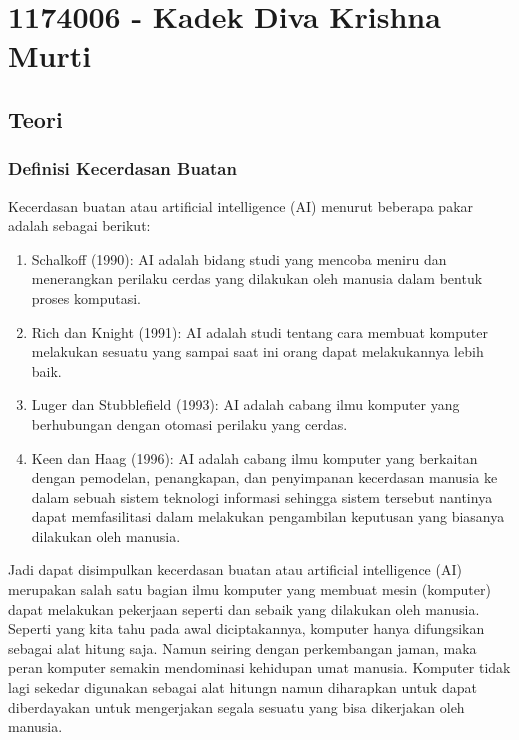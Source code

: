 \section{1174006 - Kadek Diva Krishna Murti}

\subsection{Teori}
\subsubsection{Definisi Kecerdasan Buatan}
\hfill\break
Kecerdasan buatan atau artificial intelligence (AI) menurut beberapa pakar adalah sebagai berikut:
\begin{enumerate}
	\item Schalkoff (1990): AI adalah bidang studi yang mencoba meniru dan menerangkan perilaku cerdas yang dilakukan oleh manusia dalam bentuk proses komputasi.
	\item Rich dan Knight (1991): AI adalah studi tentang cara membuat komputer melakukan sesuatu yang sampai saat ini orang dapat melakukannya lebih baik.
	\item Luger dan Stubblefield (1993): AI adalah cabang ilmu komputer yang berhubungan dengan otomasi perilaku yang cerdas.
	\item Keen dan Haag (1996): AI adalah cabang ilmu komputer yang berkaitan dengan pemodelan, penangkapan, dan penyimpanan kecerdasan manusia ke dalam sebuah sistem teknologi informasi sehingga sistem tersebut nantinya dapat memfasilitasi dalam melakukan pengambilan keputusan yang biasanya dilakukan oleh manusia.
\end{enumerate}
\noindent
Jadi dapat disimpulkan kecerdasan buatan atau artificial intelligence (AI) merupakan salah satu bagian ilmu komputer yang membuat mesin (komputer) dapat melakukan pekerjaan seperti dan sebaik yang dilakukan oleh manusia. Seperti yang kita tahu pada awal diciptakannya, komputer hanya difungsikan sebagai alat hitung saja. Namun seiring dengan perkembangan jaman, maka peran komputer semakin mendominasi kehidupan umat manusia. Komputer tidak lagi sekedar digunakan sebagai alat hitungn namun diharapkan untuk dapat diberdayakan untuk mengerjakan segala sesuatu yang bisa dikerjakan oleh manusia.

